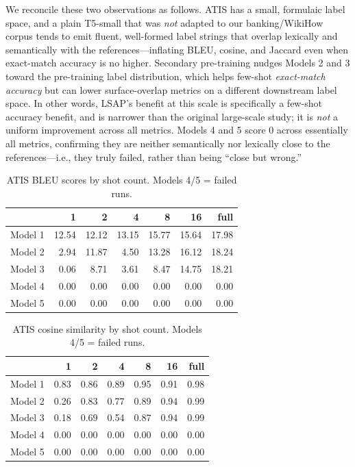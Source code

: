 \documentclass[11pt]{article}
\begin{document}
We reconcile these two observations as follows. ATIS has a small,
formulaic label space, and a plain T5-small that was \emph{not} adapted to
our banking/WikiHow corpus tends to emit fluent, well-formed label strings
that overlap lexically and semantically with the references---inflating
BLEU, cosine, and Jaccard even when exact-match accuracy is no higher.
Secondary pre-training nudges Models 2 and 3 toward the pre-training label
distribution, which helps few-shot \emph{exact-match accuracy} but can lower
surface-overlap metrics on a different downstream label space. In other
words, LSAP's benefit at this scale is specifically a few-shot accuracy
benefit, and is narrower than the original large-scale study; it is
\emph{not} a uniform improvement across all metrics. Models 4 and 5 score 0
across essentially all metrics, confirming they are neither semantically nor
lexically close to the references---i.e., they truly failed, rather than
being ``close but wrong.''

\begin{table}[t]
\centering
\small
\setlength{\tabcolsep}{4pt}
\begin{tabular}{lrrrrrr}
\toprule
 & 1 & 2 & 4 & 8 & 16 & full \\
\midrule
Model 1 & 12.54 & 12.12 & 13.15 & 15.77 & 15.64 & 17.98 \\
Model 2 & 2.94 & 11.87 & 4.50 & 13.28 & 16.12 & 18.24 \\
Model 3 & 0.06 & 8.71 & 3.61 & 8.47 & 14.75 & 18.21 \\
Model 4 & 0.00 & 0.00 & 0.00 & 0.00 & 0.00 & 0.00 \\
Model 5 & 0.00 & 0.00 & 0.00 & 0.00 & 0.00 & 0.00 \\
\bottomrule
\end{tabular}
\caption{ATIS BLEU scores by shot count. Models 4/5 = failed runs.}
\label{tab:atis-bleu}
\end{table}

\begin{table}[t]
\centering
\small
\setlength{\tabcolsep}{4pt}
\begin{tabular}{lrrrrrr}
\toprule
 & 1 & 2 & 4 & 8 & 16 & full \\
\midrule
Model 1 & 0.83 & 0.86 & 0.89 & 0.95 & 0.91 & 0.98 \\
Model 2 & 0.26 & 0.83 & 0.77 & 0.89 & 0.94 & 0.99 \\
Model 3 & 0.18 & 0.69 & 0.54 & 0.87 & 0.94 & 0.99 \\
Model 4 & 0.00 & 0.00 & 0.00 & 0.00 & 0.00 & 0.00 \\
Model 5 & 0.00 & 0.00 & 0.00 & 0.00 & 0.00 & 0.00 \\
\bottomrule
\end{tabular}
\caption{ATIS cosine similarity by shot count. Models 4/5 = failed runs.}
\label{tab:atis-cos}
\end{table}
\end{document}
